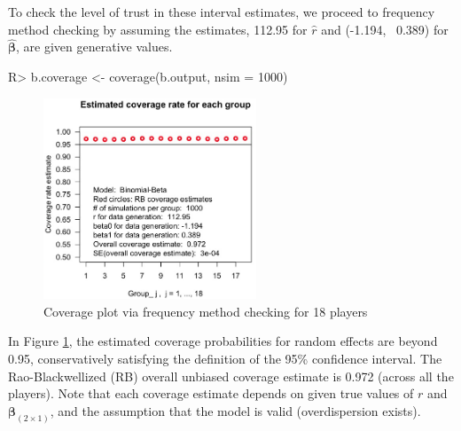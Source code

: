 \documentclass[article]{jss}
\begin{document}
To check the level of trust in these interval estimates, we  proceed to frequency method checking by assuming the estimates, 112.95 for $\hat{r}$ and (-1.194, ~0.389) for $\hat{\boldsymbol{\beta}}$, are given generative values. 

\begin{CodeChunk}
\begin{CodeInput}
R> b.coverage <- coverage(b.output, nsim = 1000) 
\end{CodeInput}
\end{CodeChunk}
\begin{figure}[h!]
\begin{center}
\includegraphics[width = 2.5in]{baseball2.png}
\caption{Coverage plot via frequency method checking for 18 players}
\label{fig:baseball2}
\end{center}
\end{figure}



In Figure \ref{fig:baseball2},  the estimated coverage probabilities for random effects are beyond 0.95, conservatively satisfying the definition of the 95\% confidence interval. The Rao-Blackwellized (RB) overall unbiased coverage estimate is 0.972 (across all the players). Note that each coverage estimate depends on given true values of $r$ and $\boldsymbol{\beta}_{(2\times1)}$, and the assumption that the model is valid (overdispersion exists).
\end{document}

